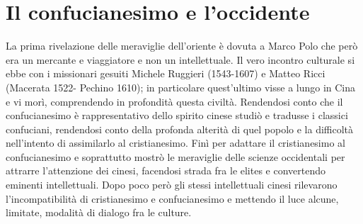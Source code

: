 \documentclass[10pt,a4paper]{report}
\begin{document}
\section{Il confucianesimo e l'occidente}
La prima rivelazione delle meraviglie dell'oriente è dovuta a Marco Polo che però era un mercante e viaggiatore e non un intellettuale. Il vero incontro culturale si ebbe con i missionari gesuiti Michele Ruggieri (1543-1607) e Matteo Ricci (Macerata 1522- Pechino 1610); in particolare quest'ultimo visse a lungo in Cina e vi morì, comprendendo in profondità questa civiltà. Rendendosi conto che il confucianesimo è rappresentativo dello spirito cinese studiò e tradusse i classici confuciani, rendendosi conto della profonda alterità di quel popolo e la difficoltà nell'intento di assimilarlo al cristianesimo. Finì per adattare il cristianesimo al confucianesimo e soprattutto mostrò le meraviglie delle scienze occidentali per attrarre l'attenzione dei cinesi, facendosi strada fra le elites e convertendo eminenti intellettuali. Dopo poco però gli stessi intellettuali cinesi rilevarono l'incompatibilità di cristianesimo e confucianesimo e mettendo il luce alcune, limitate, modalità di dialogo fra le culture.\\
\end{document}
